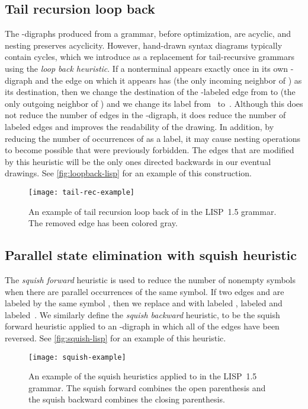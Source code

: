 \documentclass[10pt]{llncs}
\begin{document}
\subsection{Tail recursion loop back}
The -digraphs produced from a grammar, before optimization, are acyclic, and nesting preserves acyclicity. However, hand-drawn syntax diagrams typically contain cycles, which we introduce as a replacement for tail-recursive grammars using the \emph{loop back heuristic}. If a nonterminal  appears exactly once in its own -digraph and the edge on which it appears has  (the only incoming neighbor of ) as its destination, then we change the destination of the -labeled edge from  to  (the only outgoing neighbor of ) and we change its label from~ to~. Although this does not reduce the number of edges in the -digraph, it does reduce the number of labeled edges and improves the readability of the drawing. In addition, by reducing the number of occurrences of  as a label, it may cause nesting operations to become possible that were previously forbidden. The edges that are modified by this heuristic will be the only ones directed backwards in our eventual drawings. See \autoref{fig:loopback-lisp} for an example of this construction.

\begin{figure}
\centering
\texttt{[image: tail-rec-example]}
\caption{An example of tail recursion loop back of  in the LISP~1.5 grammar. The removed edge has been colored gray.}
\label{fig:loopback-lisp}
\end{figure}

\subsection{Parallel state elimination with squish heuristic}
The \emph{squish forward} heuristic is used to reduce the number of nonempty symbols when there are parallel occurrences of the same symbol. If two edges  and  are labeled by the same symbol , then we replace  and  with  labeled ,  labeled  and  labeled~. We similarly define the \emph{squish backward} heuristic, to be the squish forward heuristic applied to an -digraph in which all of the edges have been reversed. See \autoref{fig:squish-lisp} for an example of this heuristic.

\begin{figure}
\centering
\texttt{[image: squish-example]}
\caption{An example of the squish heuristics applied to  in the LISP~1.5 grammar. The squish forward combines the open parenthesis and the squish backward combines the closing parenthesis.}
\label{fig:squish-lisp}
\end{figure}
\end{document}
